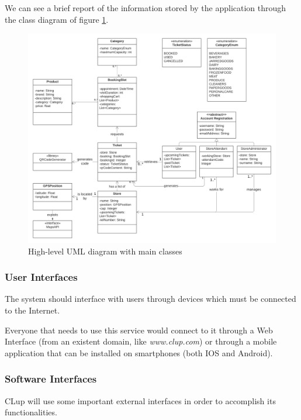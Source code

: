 \documentclass[table, 12pt]{article}
\begin{document}
We can see a brief report of the information stored by the application through the class diagram of figure \ref{class_diagram}.

\begin{figure}
    \begin{center}
        \hspace*{-1.5in}
        \includegraphics[width=\paperwidth]{assets/UML.png}
        \caption{High-level UML diagram with main classes}
        \label{class_diagram}
    \end{center}

\end{figure}

\subsubsection{User Interfaces}
The system should interface with users through devices which must be connected to the Internet.

Everyone that needs to use this service would connect to it through a Web Interface (from an existent domain, like \textit{www.clup.com}) or through a mobile application that can be installed on smartphones (both IOS and Android).

\subsubsection{Software Interfaces}
CLup will use some important external interfaces in order to accomplish its functionalities.
\end{document}
